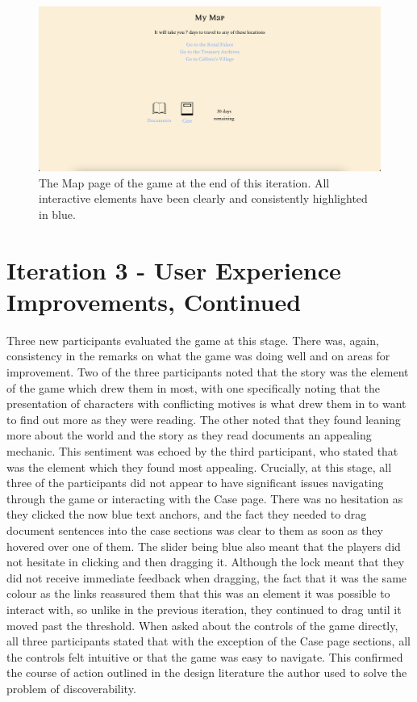 \documentclass{l4proj}
\begin{document}
\begin{figure}[htb]
    \centering
    \includegraphics[scale=0.25]{images/Map_2.png}
    \caption{The Map page of the game at the end of this iteration. All interactive elements have been clearly and consistently highlighted in blue.}
    \label{fig:Map2}
\end{figure}


\section{Iteration 3 - User Experience Improvements, Continued}

Three new participants evaluated the game at this stage. There was, again, consistency in the remarks on what the game was doing well and on areas for improvement. Two of the three participants noted that the story was the element of the game which drew them in most, with one specifically noting that the presentation of characters with conflicting motives is what drew them in to want to find out more as they were reading. The other noted that they found leaning more about the world and the story as they read documents an appealing mechanic. This sentiment was echoed by the third participant, who stated that was the element which they found most appealing. Crucially, at this stage, all three of the participants did not appear to have significant issues navigating through the game or interacting with the Case page. There was no hesitation as they clicked the now blue text anchors, and the fact they needed to drag document sentences into the case sections was clear to them as soon as they hovered over one of them. The slider being blue also meant that the players did not hesitate in clicking and then dragging it. Although the lock meant that they did not receive immediate feedback when dragging, the fact that it was the same colour as the links reassured them that this was an element it was possible to interact with, so unlike in the previous iteration, they continued to drag until it moved past the threshold. When asked about the controls of the game directly, all three participants stated that with the exception of the Case page sections, all the controls felt intuitive or that the game was easy to navigate. This confirmed the course of action outlined in the design literature the author used to solve the problem of discoverability. 
\end{document}
